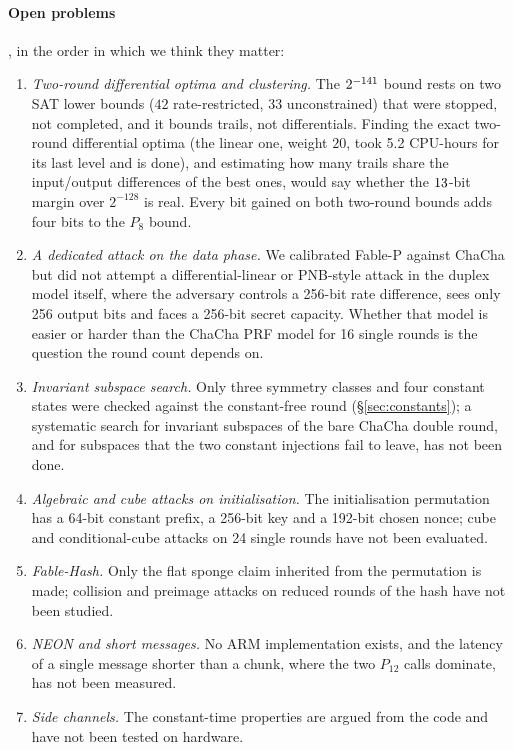 \documentclass{iacrtrans}
\newcommand{\FableP}{\textsf{Fable-P}\xspace}
\newcommand{\FableHash}{\textsf{Fable-Hash}\xspace}
\newcommand{\ChaCha}{\textsf{ChaCha}\xspace}
\newcommand{\PP}[1]{P_{#1}}
\newcommand{\WrateTwo}{42}   %
\newcommand{\WuncTwo}{33}    %
\newcommand{\WlinTwo}{20}    %
\newcommand{\BoundEight}{\the\numexpr\WrateTwo+3*\WuncTwo\relax}   %
\begin{document}
\paragraph{Open problems}, in the order in which we think they matter:
\begin{enumerate}
\item \emph{Two-round differential optima and clustering.} The $2^{-\BoundEight}$ bound rests on two SAT lower bounds ($\WrateTwo$ rate-restricted, $\WuncTwo$ unconstrained) that were stopped, not completed, and it bounds trails, not differentials. Finding the exact two-round differential optima (the linear one, weight $\WlinTwo$, took 5.2 CPU-hours for its last level and is done), and estimating how many trails share the input/output differences of the best ones, would say whether the $\the\numexpr\BoundEight-128\relax$-bit margin over $2^{-128}$ is real. Every bit gained on both two-round bounds adds four bits to the $\PP{8}$ bound.
\item \emph{A dedicated attack on the data phase.} We calibrated \FableP against \ChaCha but did not attempt a differential-linear or PNB-style attack in the duplex model itself, where the adversary controls a 256-bit rate difference, sees only 256 output bits and faces a 256-bit secret capacity. Whether that model is easier or harder than the \ChaCha PRF model for 16 single rounds is the question the round count depends on.
\item \emph{Invariant subspace search.} Only three symmetry classes and four constant states were checked against the constant-free round (\S\ref{sec:constants}); a systematic search for invariant subspaces of the bare \ChaCha double round, and for subspaces that the two constant injections fail to leave, has not been done.
\item \emph{Algebraic and cube attacks on initialisation.} The initialisation permutation has a 64-bit constant prefix, a 256-bit key and a 192-bit chosen nonce; cube and conditional-cube attacks on 24 single rounds have not been evaluated.
\item \emph{\FableHash.} Only the flat sponge claim inherited from the permutation is made; collision and preimage attacks on reduced rounds of the hash have not been studied.
\item \emph{NEON and short messages.} No ARM implementation exists, and the latency of a single message shorter than a chunk, where the two $\PP{12}$ calls dominate, has not been measured.
\item \emph{Side channels.} The constant-time properties are argued from the code and have not been tested on hardware.
\end{enumerate}
\end{document}
